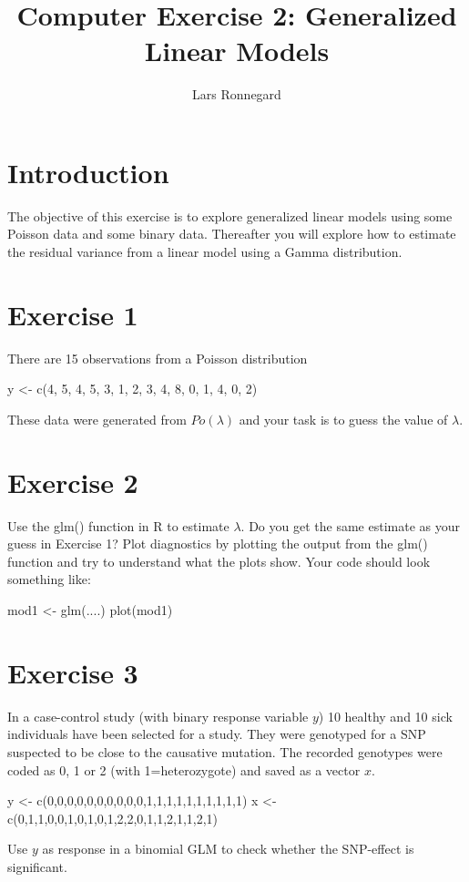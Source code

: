 \documentclass[10pt,a4paper,english]{report}
\begin{document}
\title{Computer Exercise 2: Generalized Linear Models}
\author{Lars Ronnegard}
\maketitle
\section*{Introduction}
The objective of this exercise is to explore generalized linear models using some Poisson data and some binary data. Thereafter you will explore how to estimate the residual variance from a linear model using a Gamma distribution.


\section*{Exercise 1}
There are 15 observations from a Poisson distribution
\begin{Schunk}
\begin{Sinput}
y <-  c(4, 5, 4, 5, 3, 1, 2, 3, 4, 8, 0, 1, 4, 0, 2)
\end{Sinput}
\end{Schunk}

These data were generated from $Po(\lambda)$ and your task is to guess the value of $\lambda$. 

\section*{Exercise 2}
Use the glm() function in R to estimate $\lambda$. Do you get the same estimate as your guess in Exercise 1? \newline
Plot diagnostics by plotting the output from the glm() function and try to understand what the plots show.
Your code should look something like:
\begin{Schunk}
\begin{Sinput}
mod1 <- glm(....)
plot(mod1)
\end{Sinput}
\end{Schunk}

\section*{Exercise 3}
In a case-control study (with binary response variable $y$)  10 healthy and 10 sick individuals have been selected for a study. They were genotyped for a SNP suspected to be close to the causative mutation. The recorded genotypes were coded as 0, 1 or 2 (with 1=heterozygote) and saved as a vector $x$.    
\begin{Schunk}
\begin{Sinput}
y <- c(0,0,0,0,0,0,0,0,0,0,1,1,1,1,1,1,1,1,1,1)
x <- c(0,1,1,0,0,1,0,1,0,1,2,2,0,1,1,2,1,1,2,1)
\end{Sinput}
\end{Schunk}
Use $y$ as response in a binomial GLM to check whether the SNP-effect is significant.
\end{document}
